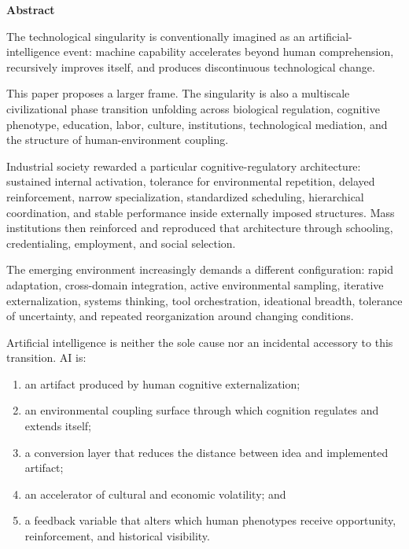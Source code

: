 \documentclass[10pt]{article}
\newcommand{\ActiveAccent}{Industrial}
\newcommand{\ActivePale}{PaleIndustrial}
\newcommand{\MovementLabel}{THE INDUSTRIAL ORDER}
\newcommand{\papersection}[2]{%
  \Needspace{8\baselineskip}
  \vspace{1.1em}
  \noindent\begin{minipage}[t]{0.12\textwidth}
    \vspace{1pt}{\sffamily\bfseries\fontsize{17}{17}\selectfont\textcolor{\ActiveAccent}{#1}}
  \end{minipage}%
  \begin{minipage}[t]{0.86\textwidth}
    {\sffamily\bfseries\fontsize{16.2}{19}\selectfont #2}\par
    \vspace{0.35em}{\color{\ActiveAccent}\rule{\linewidth}{1.15pt}}
  \end{minipage}
  \vspace{0.55em}
}
\begin{document}
\hypersetup{pageanchor=true}
\setcounter{page}{2}
\renewcommand{\ActiveAccent}{Polymathic}\renewcommand{\ActivePale}{PalePolymathic}\renewcommand{\MovementLabel}{ORIENTATION}

\papersection{}{Abstract}

The technological singularity is conventionally imagined as an artificial-intelligence event: machine capability accelerates beyond human comprehension, recursively improves itself, and produces discontinuous technological change.

This paper proposes a larger frame. The singularity is also a multiscale civilizational phase transition unfolding across biological regulation, cognitive phenotype, education, labor, culture, institutions, technological mediation, and the structure of human-environment coupling.

Industrial society rewarded a particular cognitive-regulatory architecture: sustained internal activation, tolerance for environmental repetition, delayed reinforcement, narrow specialization, standardized scheduling, hierarchical coordination, and stable performance inside externally imposed structures. Mass institutions then reinforced and reproduced that architecture through schooling, credentialing, employment, and social selection.

The emerging environment increasingly demands a different configuration: rapid adaptation, cross-domain integration, active environmental sampling, iterative externalization, systems thinking, tool orchestration, ideational breadth, tolerance of uncertainty, and repeated reorganization around changing conditions.

Artificial intelligence is neither the sole cause nor an incidental accessory to this transition. AI is:

\begin{enumerate}
  \item an artifact produced by human cognitive externalization;
  \item an environmental coupling surface through which cognition regulates and extends itself;
  \item a conversion layer that reduces the distance between idea and implemented artifact;
  \item an accelerator of cultural and economic volatility; and
  \item a feedback variable that alters which human phenotypes receive opportunity, reinforcement, and historical visibility.
\end{enumerate}
\end{document}

